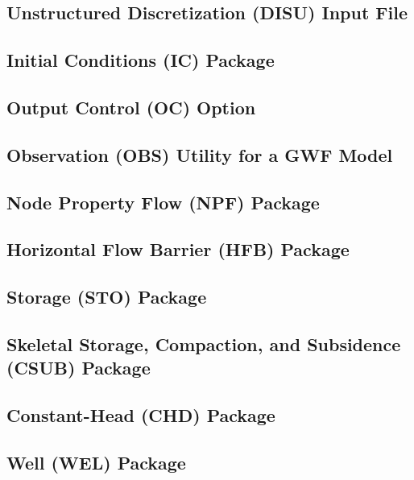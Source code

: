 \newpage
\subsection{Unstructured Discretization (DISU) Input File}


\newpage
\subsection{Initial Conditions (IC) Package}


\newpage
\subsection{Output Control (OC) Option}


\newpage
\subsection{Observation (OBS) Utility for a GWF Model}


\newpage
\subsection{Node Property Flow (NPF) Package}


\newpage
\subsection{Horizontal Flow Barrier (HFB) Package}


\newpage
\subsection{Storage (STO) Package}


\newpage
\subsection{Skeletal Storage, Compaction, and Subsidence (CSUB) Package}


\newpage
\subsection{Constant-Head (CHD) Package}


\newpage
\subsection{Well (WEL) Package}


